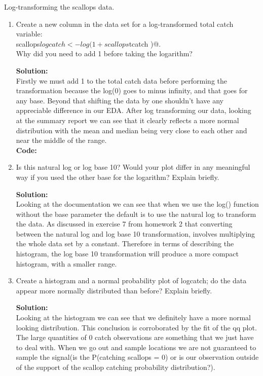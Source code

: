 \documentclass[12pt]{article}
\makeatletter
\theoremstyle{homework}
\newenvironment{exercise}[1]
{\def\@currentlabel{#1}\exercisecore}
{\endexercisecore}
\newcommand{\localhead}[1]{\par\smallskip\noindent\textbf{#1}\nobreak\\}%
\newcommand\solution{\localhead{Solution:}}
\makeatother
\begin{document}
\begin{exercise}{2} Log-transforming the scallops data.\\
  \begin{enumerate}


  \item Create a new column in the data set for a log-transformed total catch variable:\\
  \verb@    scallops$logcatch <- log( 1 + scallops$tcatch )@.\\
  Why did you need to add 1 before taking the logarithm?\\
  \solution Firstly we must add 1 to the total catch data before performing the transformation because
  the log(0) goes to minus infinity, and that goes for any base. Beyond that shifting the data by one shouldn't have 
  any appreciable difference in our EDA. After log transforming our data, looking at the summary report we can see that it 
  clearly reflects a more normal distribution with the mean and median being very close to each other and near the middle of the range.\\
  \textbf{Code:}
  \begin{center}
  
  \end{center}
  \vspace{.15in}
  

  \item Is this natural log or log base 10? Would your plot differ in
  any meaningful way if you used the other base for the logarithm? Explain briefly.\\
  \solution Looking at the documentation we can see that when we use the log() function without the 
  base parameter the default is to use the natural log to transform the data. As discussed in exercise 7 from homework 
  2 that converting between the natural log and log base 10 transformation, involves multiplying 
  the whole data set by a constant. Therefore in terms of describing the histogram, the log base 10 transformation will 
  produce a more compact histogram, with a smaller range.   
  \vspace{.15in}

  
  
  \item Create a histogram and a normal probability plot 
  of logcatch; do the data appear more normally distributed
  than before?  Explain briefly.\\
  \solution Looking at the histogram we can see that we definitely have a more normal looking 
  distribution. This conclusion is corroborated by the fit of the qq plot. The large quantities of
  0 catch observations are something that we just have to deal with. When we go out and sample locations 
  we are not guaranteed to sample the signal(is the P(catching scallops = 0) or is our observation outside 
  of the support of the scallop catching probability distribution?). 


\end{enumerate}
\end{exercise}
\end{document}
